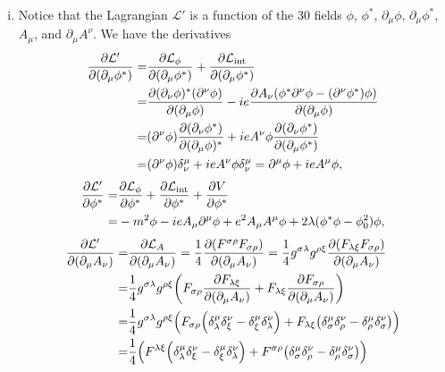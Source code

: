 \documentclass{article}
\begin{document}
\begin{enumerate}
\begin{enumerate}[(i)]
\item Notice that the Lagrangian $\mathcal{L}'$ is a function of the 30 fields $\phi$, $\phi^*$, $\partial_\mu\phi$, $\partial_\mu\phi^*$, $A_\mu$, and $\partial_\mu A^\nu$. We have the derivatives
\begin{align}
\begin{split}
\pdv{\mathcal{L}'}{(\partial_\mu\phi^*)}=&\pdv{\mathcal{L}_\phi}{(\partial_\mu\phi^*)}+\pdv{\mathcal{L}_\text{int}}{(\partial_\mu\phi^*)}\\
=&\pdv{(\partial_\nu\phi)^*(\partial^\nu\phi)}{(\partial_\mu\phi)}-ie\pdv{A_\nu(\phi^*\partial^\nu\phi-(\partial^\nu\phi^*)\phi)}{(\partial_\mu\phi)}\\
=&(\partial^\nu\phi)\pdv{(\partial_\nu\phi^*)}{(\partial_\mu\phi)^*}+ieA^\nu\phi\pdv{(\partial_\nu\phi^*)}{(\partial_\mu\phi^*)}\\
=&(\partial^\nu\phi)\delta^\mu_\nu+ieA^\nu\phi\delta^\mu_\nu=\partial^\mu\phi+ieA^\mu\phi,
\end{split}
\end{align}
\begin{align}
\begin{split}
\pdv{\mathcal{L}'}{\phi^*}=&\pdv{\mathcal{L}_\phi}{\phi^*}+\pdv{\mathcal{L}_\text{int}}{\phi^*}+\pdv{V}{\phi^*}\\
=&-m^2\phi-ieA_\mu\partial^\mu\phi+e^2A_\mu A^\mu\phi+2\lambda(\phi^*\phi-\phi_0^2)\phi,
\end{split}
\end{align}
\begin{align}
\begin{split}
\pdv{\mathcal{L}'}{(\partial_\mu A_\nu)}=&\pdv{\mathcal{L}_A}{(\partial_\mu A_\nu)}=\frac{1}{4}\pdv{(F^{\sigma\rho}F_{\sigma\rho})}{(\partial_\mu A_\nu)}=\frac{1}{4}g^{\sigma\lambda}g^{\rho\xi}\pdv{(F_{\lambda\xi}F_{\sigma\rho})}{(\partial_\mu A_\nu)}\\
=&\frac{1}{4}g^{\sigma\lambda}g^{\rho\xi}\qty(F_{\sigma\rho}\pdv{F_{\lambda\xi}}{(\partial_\mu A_\nu)}+F_{\lambda\xi}\pdv{F_{\sigma\rho}}{(\partial_\mu A_\nu)})\\
=&\frac{1}{4}g^{\sigma\lambda}g^{\rho\xi}\qty(F_{\sigma\rho}\qty(\delta^\mu_\lambda\delta^\nu_\xi-\delta^\mu_\xi\delta^\nu_\lambda)+F_{\lambda\xi}\qty(\delta^\mu_\sigma\delta^\nu_\rho-\delta^\mu_\rho\delta^\nu_\sigma))\\
=&\frac{1}{4}\qty(F^{\lambda\xi}\qty(\delta^\mu_\lambda\delta^\nu_\xi-\delta^\mu_\xi\delta^\nu_\lambda)+F^{\sigma\rho}\qty(\delta^\mu_\sigma\delta^\nu_\rho-\delta^\mu_\rho\delta^\nu_\sigma))\\

\end{split}
\end{align}
\end{enumerate}
\end{enumerate}
\end{document}
